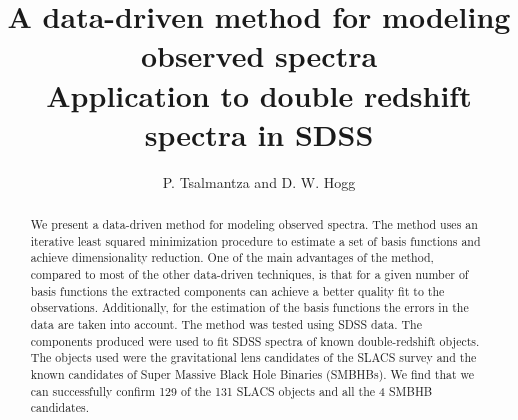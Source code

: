 \documentclass[apj]{emulateapj}
\begin{document}

\title{A data-driven method for modeling observed spectra\\
Application to double redshift spectra in SDSS}


\author{P. Tsalmantza and D. W. Hogg}





\begin{abstract}
We present a data-driven method for modeling observed spectra. The method uses an iterative least squared minimization procedure to estimate a set of basis functions and achieve dimensionality reduction. One of the main advantages of the method, compared to most of the other data-driven techniques, is that for a given number of basis functions the extracted components can achieve a better quality fit to the observations. Additionally, for the estimation of the basis functions the errors in the data are taken into account. The method was tested using SDSS data. The components produced were used to fit SDSS spectra of known double-redshift objects. The objects used were the gravitational lens candidates of the SLACS survey and the known candidates of Super Massive Black Hole Binaries (SMBHBs). We find that we can successfully confirm 129 of the 131 SLACS objects and all the 4 SMBHB candidates.
\end{abstract}
\end{document}

